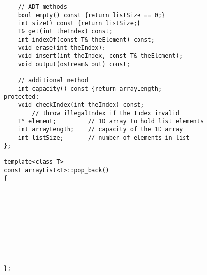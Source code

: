 \begin{enumerate}
\begin{verbatim}
    // ADT methods
    bool empty() const {return listSize == 0;}
    int size() const {return listSize;}
    T& get(int theIndex) const;
    int indexOf(const T& theElement) const;
    void erase(int theIndex);
    void insert(int theIndex, const T& theElement);
    void output(ostream& out) const;

    // additional method
    int capacity() const {return arrayLength;
protected: 
    void checkIndex(int theIndex) const;
        // throw illegalIndex if the Index invalid
    T* element;         // 1D array to hold list elements
    int arrayLength;    // capacity of the 1D array
    int listSize;       // number of elements in list
};

template<class T>
const arrayList<T>::pop_back()
{










};
    \end{verbatim}
\end{enumerate}

